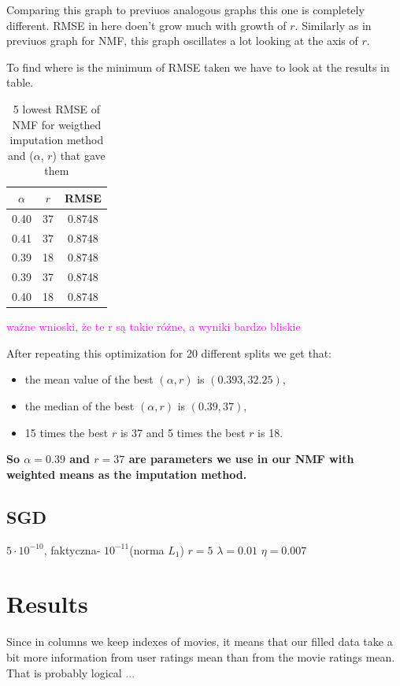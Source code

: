 \documentclass[11pt]{amsart}
\newcommand{\tami}[1]{{\textcolor{magenta}{#1}}}
\begin{document}
Comparing this graph to previuos analogous graphs this one is completely different.
RMSE in here doen't grow much with growth of $r$.
Similarly as in previuos graph for NMF, this graph oscillates a lot looking at the axis of $r$.

To find where is the minimum of RMSE taken we have to look at the results in table.

\begin{table}[H]
\begin{tabular}{cc|c}
$\alpha$ &  $r$ &     RMSE \\
\hline
       0.40 & 37 & 0.8748 \\
       0.41 & 37 & 0.8748 \\
       0.39 & 18 & 0.8748 \\
       0.39 & 37 & 0.8748 \\
       0.40 & 18 & 0.8748 \\
\end{tabular}
\caption{5 lowest RMSE of NMF for weigthed imputation method and ($\alpha$, $r$) that gave them}
\end{table}

\tami{ważne wnioski, że te r są takie różne, a wyniki bardzo bliskie}

After repeating this optimization for 20 different splits we get that:
\begin{itemize}
    \item the mean value of the best $(\alpha, r)$ is $(0.393, 32.25)$,
    \item the median of the best $(\alpha, r)$ is $(0.39, 37)$,
    \item 15 times the best $r$ is 37 and 5 times the best $r$ is 18.
\end{itemize}
\textbf{So $\alpha = 0.39$ and $r=37$ are parameters we use in our NMF with weighted means as the imputation method.}




\subsection*{SGD}
$5\cdot 10^{-10}$, faktyczna- $10^{-11}$(norma $L_1$)
$r = 5$
$\lambda = 0.01$
$\eta = 0.007$




\section{}

\section{Results}

Since in columns we keep indexes of movies, it means that our filled data take a bit more information from user ratings mean than from the movie ratings mean.
That is probably logical \tami{...}
\end{document}
